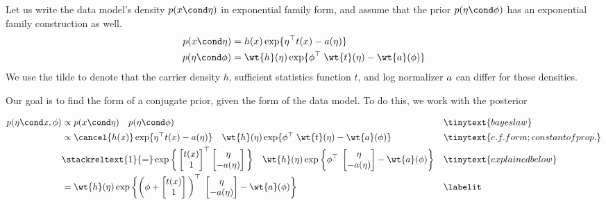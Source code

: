
Let us write the data model's density $p(x \cond \eta)$ in exponential family form, and assume that the prior $p(\eta \cond \phi)$ has an exponential family construction as well.  
\begin{align*}
p(x \cond \eta) &= h(x) \exp \{\eta^\top \sufficientStatsFunction(x) - \logNormalizerFunction(\eta)   \}	 \\
p(\eta \cond \phi) &= \wt{h}(\eta) \exp \{\phi^\top \; \wt{\sufficientStatsFunction}(\eta) - \wt{\logNormalizerFunction}(\phi)   \}	
\end{align*}
We use the tilde to denote that the carrier density $h$, sufficient statistics function $t$, and log normalizer $a$ can differ for these densities.  

Our goal is to find the form of a conjugate prior, given the form of the data model.    To do this, we work with the posterior 

\begin{align*}
p(\eta \cond x, \phi) & \propto p(x \cond \eta) \quad p(\eta \cond \phi) && \tinytext{bayes law}  \\
&\propto  \cancel{h(x)} \exp \{\eta^\top \sufficientStatsFunction(x) - \logNormalizerFunction(\eta)  \}  \quad \wt{h}(\eta) \exp \{\phi^\top \; \wt{\sufficientStatsFunction}(\eta) - \wt{\logNormalizerFunction}(\phi)   \}	&& \tinytext{e.f. form; constant of prop.}\\
& \stackreltext{1}{=} \exp \bigg\{
\begin{bmatrix} 
\sufficientStatsFunction(x) \\
1 \\
\end{bmatrix}^\top
\begin{bmatrix} 
\eta \\
-\logNormalizerFunction(\eta)
\end{bmatrix}
\bigg\} \quad 
\wt{h}(\eta) \exp \bigg\{ \phi^\top \; \begin{bmatrix} 
\eta \\
-\logNormalizerFunction(\eta)
\end{bmatrix} - \wt{\logNormalizerFunction}(\phi)  \bigg\} && \tinytext{explained below} \\
&= \wt{h}(\eta) \exp \bigg\{ \bigg( \phi + \begin{bmatrix} 
\sufficientStatsFunction(x) \\
1 \\
\end{bmatrix} \bigg)^\top \; \begin{bmatrix} 
\eta \\
-\logNormalizerFunction(\eta)
\end{bmatrix} - \wt{\logNormalizerFunction}(\phi)  \bigg\} && 
\labelit \label{eqn:posterior_under_conjugate_prior}\\
\end{align*}


